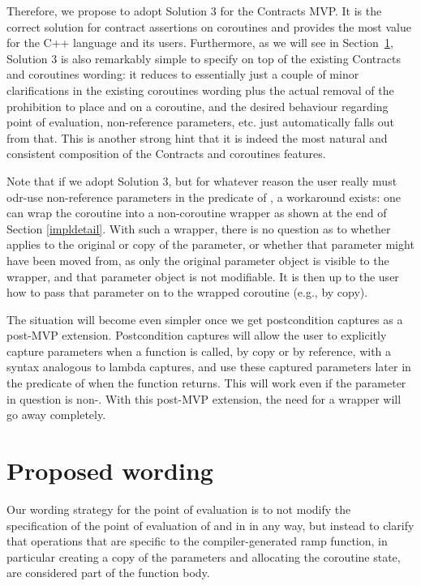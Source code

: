 Therefore, we propose to adopt Solution 3 for the Contracts MVP. It is the correct solution for contract assertions on coroutines and provides the most value for the C++ language and its users. Furthermore, as we will see in Section~\ref{wording}, Solution 3 is also remarkably simple to specify on top of the existing Contracts and coroutines wording: it reduces to essentially just a couple of minor clarifications in the existing coroutines wording plus the actual removal of the prohibition to place  and  on a coroutine, and the desired behaviour regarding point of evaluation, non-reference parameters, etc. just automatically falls out from that. This is another strong hint that it is indeed the most natural and consistent composition of the Contracts and coroutines features.

Note that if we adopt Solution 3, but for whatever reason the user really must odr-use non-reference parameters in the predicate of , a workaround exists: one can wrap the coroutine into a non-coroutine wrapper as shown at the end of Section \ref{impldetail}. With such a wrapper, there is no question as to whether  applies to the original or copy of the parameter, or whether that parameter might have been moved from, as only the original parameter object is visible to the wrapper, and that parameter object is not modifiable. It is then up to the user how to pass that parameter on to the wrapped coroutine (e.g., by copy).

The situation will become even simpler once we get postcondition captures \cite{P3098R0} as a post-MVP extension. Postcondition captures will allow the user to explicitly capture parameters when a function is called, by copy or by reference, with a syntax analogous to lambda captures, and use these captured parameters later in the predicate of  when the function returns. This will work even if the parameter in question is non-. With this post-MVP extension, the need for a wrapper will go away completely.

\section{Proposed wording}
\label{wording}

Our wording strategy for the point of evaluation is to not modify the specification of the point of evaluation of  and  in \cite{P2900R8} in any way, but instead to clarify that  operations that are specific to the compiler-generated ramp function, in particular creating a copy of the parameters and allocating the coroutine state, are considered part of the function body.

